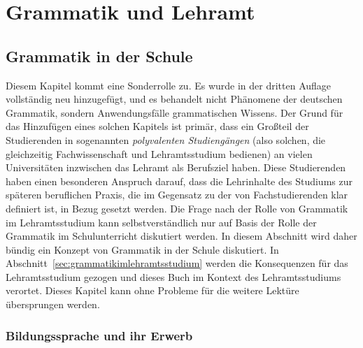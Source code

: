 \chapter{Grammatik und Lehramt}
\label{sec:grammatikundlehramt}


\section{Grammatik in der Schule}
\label{sec:grammatikinderschule}

Diesem Kapitel kommt eine Sonderrolle zu.
Es wurde in der dritten Auflage vollständig neu hinzugefügt, und es behandelt nicht Phänomene der deutschen Grammatik, sondern Anwendungsfälle grammatischen Wissens.
Der Grund für das Hinzufügen eines solchen Kapitels ist primär, dass ein Großteil der Studierenden in sogenannten \textit{polyvalenten Studiengängen} (also solchen, die gleichzeitig Fachwissenschaft und Lehramtsstudium bedienen) an vielen Universitäten inzwischen das Lehramt als Berufsziel haben.
Diese Studierenden haben einen besonderen Anspruch darauf, dass die Lehrinhalte des Studiums zur späteren beruflichen Praxis, die im Gegensatz zu der von Fachstudierenden klar definiert ist, in Bezug gesetzt werden.
Die Frage nach der Rolle von Grammatik im Lehramtsstudium kann selbstverständlich nur auf Basis der Rolle der Grammatik im Schulunterricht diskutiert werden.
In diesem Abschnitt wird daher bündig ein Konzept von Grammatik in der Schule diskutiert.
In Abschnitt~\ref{sec:grammatikimlehramtsstudium} werden die Konsequenzen für das Lehramtsstudium gezogen und dieses Buch im Kontext des Lehramtsstudiums verortet.
Dieses Kapitel kann ohne Probleme für die weitere Lektüre übersprungen werden.

\subsection{Bildungssprache und ihr Erwerb}
\label{sec:bildungsspracheundihrerwerb}

